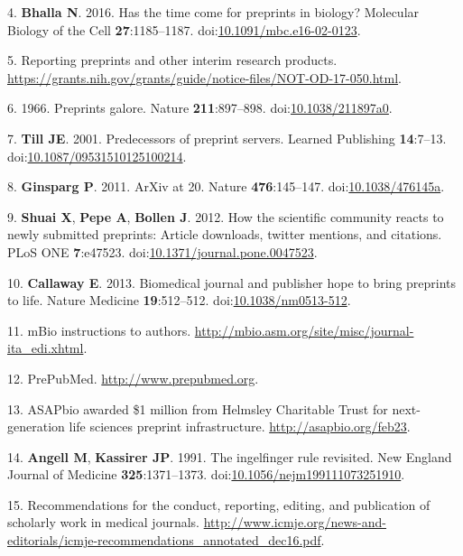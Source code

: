 \documentclass[11pt,]{article}
\begin{document}
\hypertarget{ref-Bhalla2016}{}
4. \textbf{Bhalla N}. 2016. Has the time come for preprints in biology?
Molecular Biology of the Cell \textbf{27}:1185--1187.
doi:\href{https://doi.org/10.1091/mbc.e16-02-0123}{10.1091/mbc.e16-02-0123}.

\hypertarget{ref-NIH_NOTICE}{}
5. Reporting preprints and other interim research products.
\url{https://grants.nih.gov/grants/guide/notice-files/NOT-OD-17-050.html}.

\hypertarget{ref-Nature1966}{}
6. 1966. Preprints galore. Nature \textbf{211}:897--898.
doi:\href{https://doi.org/10.1038/211897a0}{10.1038/211897a0}.

\hypertarget{ref-Till2001}{}
7. \textbf{Till JE}. 2001. Predecessors of preprint servers. Learned
Publishing \textbf{14}:7--13.
doi:\href{https://doi.org/10.1087/09531510125100214}{10.1087/09531510125100214}.

\hypertarget{ref-Ginsparg2011}{}
8. \textbf{Ginsparg P}. 2011. ArXiv at 20. Nature \textbf{476}:145--147.
doi:\href{https://doi.org/10.1038/476145a}{10.1038/476145a}.

\hypertarget{ref-Shuai2012}{}
9. \textbf{Shuai X}, \textbf{Pepe A}, \textbf{Bollen J}. 2012. How the
scientific community reacts to newly submitted preprints: Article
downloads, twitter mentions, and citations. PLoS ONE \textbf{7}:e47523.
doi:\href{https://doi.org/10.1371/journal.pone.0047523}{10.1371/journal.pone.0047523}.

\hypertarget{ref-Callaway2013}{}
10. \textbf{Callaway E}. 2013. Biomedical journal and publisher hope to
bring preprints to life. Nature Medicine \textbf{19}:512--512.
doi:\href{https://doi.org/10.1038/nm0513-512}{10.1038/nm0513-512}.

\hypertarget{ref-mBio_ITA}{}
11. mBio instructions to authors.
\url{http://mbio.asm.org/site/misc/journal-ita_edi.xhtml}.

\hypertarget{ref-PrePubMed}{}
12. PrePubMed. \url{http://www.prepubmed.org}.

\hypertarget{ref-ASAPbio}{}
13. ASAPbio awarded \$1 million from Helmsley Charitable Trust for
next-generation life sciences preprint infrastructure.
\url{http://asapbio.org/feb23}.

\hypertarget{ref-Angell1991}{}
14. \textbf{Angell M}, \textbf{Kassirer JP}. 1991. The ingelfinger rule
revisited. New England Journal of Medicine \textbf{325}:1371--1373.
doi:\href{https://doi.org/10.1056/nejm199111073251910}{10.1056/nejm199111073251910}.

\hypertarget{ref-ICMJE}{}
15. Recommendations for the conduct, reporting, editing, and publication
of scholarly work in medical journals.
\url{http://www.icmje.org/news-and-editorials/icmje-recommendations_annotated_dec16.pdf}.
\end{document}

